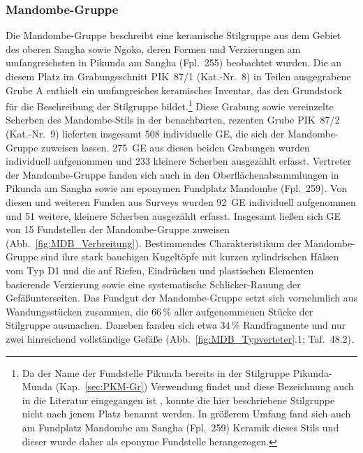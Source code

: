 \subsubsection{Mandombe-Gruppe}\label{sec:MDB-Gr}

Die Mandombe-Gruppe beschreibt eine keramische Stilgruppe aus dem Gebiet des oberen \mbox{Sangha} sowie \mbox{Ngoko}, deren Formen und Verzierungen am umfangreichsten in Pikunda am \mbox{Sangha} (Fpl.~255) beobachtet wurden. Die an diesem Platz im Grabungsschnitt PIK~87/1 (Kat.-Nr.~8) in Teilen ausgegrabene Grube A enthielt ein umfangreiches keramisches Inventar, das den Grundstock für die Beschreibung der Stilgruppe bildet.\footnote{Da der Name der Fundstelle Pikunda bereits in der Stilgruppe Pikunda-Munda (Kap.~\ref{sec:PKM-Gr}) Verwendung findet und diese Bezeichnung auch in die Literatur eingegangen ist \parencites{Eggert.1992}{Eggert.1993}{Wotzka.1995}, konnte die hier beschriebene Stilgruppe nicht nach jenem Platz benannt werden. In größerem Umfang fand sich auch am Fundplatz Mandombe am \mbox{Sangha} (Fpl.~259) Keramik dieses Stils und dieser wurde daher als eponyme Fundstelle herangezogen.} Diese Grabung sowie vereinzelte Scherben des Mandombe-Stils in der benachbarten, rezenten Grube PIK~87/2 (Kat.-Nr.~9) lieferten insgesamt 508 individuelle GE, die sich der Mandombe-Gruppe zuweisen lassen. 275~GE aus diesen beiden Grabungen wurden individuell aufgenommen und 233 kleinere Scherben ausgezählt erfasst. Vertreter der Mandombe-Gruppe fanden sich auch in den Oberflächenabsammlungen in Pikunda am \mbox{Sangha} sowie am eponymen Fundplatz Mandombe (Fpl.~259). Von diesen und weiteren Funden aus Surveys wurden 92~GE individuell aufgenommen und 51 weitere, kleinere Scherben ausgezählt erfasst. Insgesamt ließen sich GE von 15 Fundstellen der Mandombe-Gruppe zuweisen (Abb.~\ref{fig:MDB_Verbreitung}). Bestimmendes Charakteristikum der Mandombe-Gruppe sind ihre stark bauchigen Kugeltöpfe mit kurzen zylindrischen Hälsen vom Typ D1 und die auf Riefen, Eindrücken und plastischen Elementen basierende Verzierung sowie eine systematische Schlicker-Rauung der Gefäßunterseiten. Das Fundgut der Mandombe-Gruppe setzt sich vornehmlich aus Wandungsstücken zusammen, die 66\,\% aller aufgenommenen Stücke der Stilgruppe ausmachen. Daneben fanden sich etwa 34\,\% Randfragmente und nur zwei hinreichend vollständige Gefäße (Abb.~\ref{fig:MDB_Typverteter}.1; Taf.~48.2).

